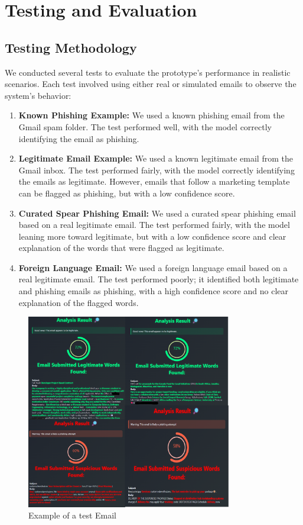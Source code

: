\documentclass{article}
\begin{document}
\section{Testing and Evaluation}

\subsection{Testing Methodology}
We conducted several tests to evaluate the prototype’s performance in realistic scenarios. Each test involved using either real or simulated emails to observe the system's behavior:
\begin{enumerate}
    \item \textbf{Known Phishing Example:}
    We used a known phishing email from the Gmail spam folder. The test performed well, with the model correctly identifying the email as phishing.
    \item \textbf{Legitimate Email Example:}
    We used a known legitimate email from the Gmail inbox. The test performed fairly, with the model correctly identifying the emails as legitimate. However, emails that follow a marketing template can be flagged as phishing, but with a low confidence score.
    \item \textbf{Curated Spear Phishing Email:}
    We used a curated spear phishing email based on a real legitimate email. The test performed fairly, with the model leaning more toward legitimate, but with a low confidence score and clear explanation of the words that were flagged as legitimate.
    \item \textbf{Foreign Language Email:}
    We used a foreign language email based on a real legitimate email. The test performed poorly; it identified both legitimate and phishing emails as phishing, with a high confidence score and no clear explanation of the flagged words.
\end{enumerate}

\begin{figure}[h!]
    \centering
    \includegraphics[width=0.8\textwidth]{Alltest.png}
    \caption{Example of a test Email}
    \label{fig:email-example}
\end{figure}
\end{document}
